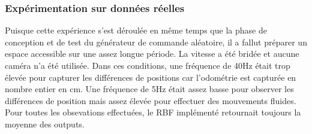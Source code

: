 \subsubsection{Expérimentation sur données réelles}\label{sec:realdataex}
Puisque cette expérience s'est déroulée en même temps que la phase de conception et de test du générateur de commande aléatoire,
il a fallut préparer un espace accessible sur une assez longue période.
La vitesse a été bridée et aucune caméra n'a été utilisée.
Dans ces conditions, une fréquence de 40Hz était trop élevée pour capturer les différences de positions car l'odométrie est capturée en nombre entier en cm.
Une fréquence de 5Hz était assez basse pour observer les différences de position mais assez élevée pour effectuer des mouvements fluides.
Pour toutes les obsevations effectuées, le RBF implémenté retournait toujours la moyenne des outputs.

